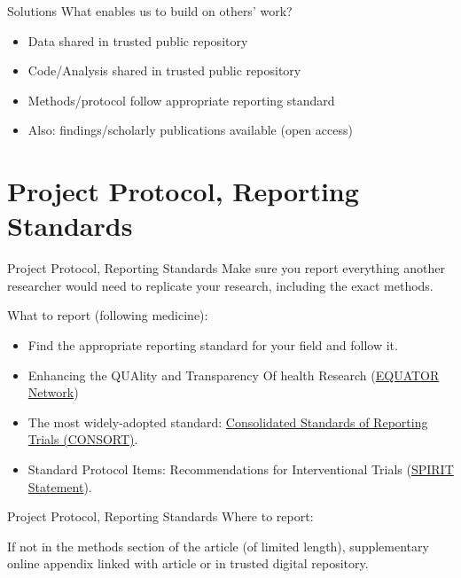 \documentclass{beamer}
\begin{document}
\begin{frame}{Solutions}
What enables us to build on others' work?
\begin{itemize}[<.->]
 \item Data shared in trusted public repository
 \item Code/Analysis shared in trusted public repository
 \item Methods/protocol follow appropriate reporting standard
 \item Also: findings/scholarly publications available (open access)
\end{itemize}
\end{frame}



\section{Project Protocol, Reporting Standards}
\begin{frame}[<.->]{Project Protocol, Reporting Standards}
 Make sure you report everything another researcher would need to replicate your research, including the exact methods.
 \pause
 
 What to report (following medicine):
\begin{itemize}
\item Find the appropriate reporting standard for your field and follow it.
\item Enhancing the QUAlity and Transparency Of health Research (\href{http://www.equator-network.org}{EQUATOR Network})
\item The most widely-adopted standard: \href{http://www.consort-statement.org}{Consolidated Standards of Reporting Trials (CONSORT)}. 
\item Standard Protocol Items: Recommendations for Interventional Trials (\href{http://www.spirit-statement.org}{SPIRIT Statement}).
\end{itemize}
\end{frame}

\begin{frame}{Project Protocol, Reporting Standards}
Where to report:

If not in the methods section of the article (of limited length), supplementary online appendix linked with article or in trusted digital repository.
\end{frame}
\end{document}
